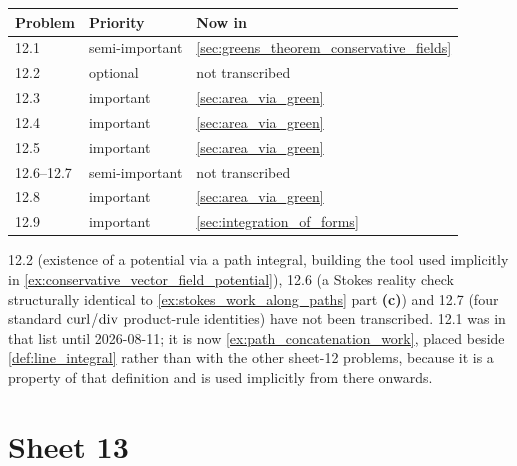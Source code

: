 \begin{center}
\begin{tabular}{@{}l l l@{}}
\textbf{Problem} & \textbf{Priority} & \textbf{Now in} \\
\hline
12.1 & semi-important & \cref{sec:greens_theorem_conservative_fields} \\[3pt]
12.2 & optional & not transcribed \\[3pt]
12.3 & important & \cref{sec:area_via_green} \\[3pt]
12.4 & important & \cref{sec:area_via_green} \\[3pt]
12.5 & important & \cref{sec:area_via_green} \\[3pt]
12.6--12.7 & semi-important & not transcribed \\[3pt]
12.8 & important & \cref{sec:area_via_green} \\[3pt]
12.9 & important & \cref{sec:integration_of_forms} \\
\end{tabular}
\end{center}

\begin{ainote}
12.2 (existence of a potential via a path integral, building the tool used implicitly in
\cref{ex:conservative_vector_field_potential}), 12.6 (a Stokes reality check structurally identical to \cref{ex:stokes_work_along_paths} part
\textbf{(c)}) and 12.7 (four standard $\operatorname{curl}$/$\operatorname{div}$ product-rule identities) have not been
transcribed. 12.1 was in that list until 2026-08-11; it is now
\cref{ex:path_concatenation_work}, placed beside \cref{def:line_integral} rather than with the
other sheet-12 problems, because it is a property of that definition and is used implicitly from
there onwards.
\end{ainote}

\section{Sheet 13}
\label{sec:sheet_index_13}


